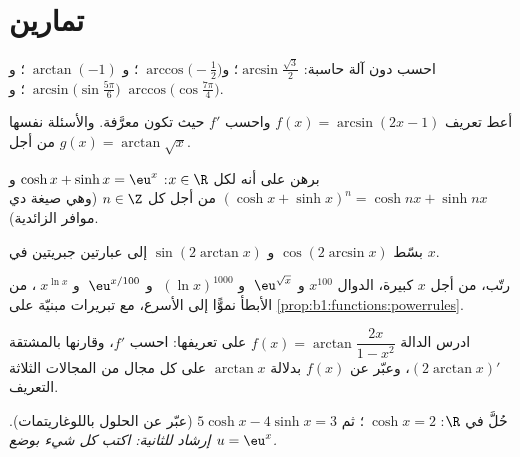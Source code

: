 \section{تمارين}

\begin{exercise}[$\star$]\label{exo:b1:functions:1}
احسب دون آلة حاسبة: $\arcsin\frac{\sqrt 3}{2}$؛
و$\;\arccos\bigl(-\frac 12\bigr)$؛ و $\;\arctan(-1)$؛
و$\;\arcsin\bigl(\sin\frac{5\pi}{6}\bigr)$؛
و$\;\arccos\bigl(\cos\frac{7\pi}{4}\bigr)$.
\end{exercise}

\begin{exercise}[$\star$]\label{exo:b1:functions:2}
أعط  تعريف $f(x) = \arcsin(2x - 1)$ واحسب
$f'$ حيث تكون معرَّفة. والأسئلة نفسها من أجل $g(x) = \arctan\sqrt{x}$.
\end{exercise}

\begin{exercise}[$\star$]\label{exo:b1:functions:3}
برهن على أنه لكل $x \in \R$: $\cosh x + \sinh x = \eu^x$ و
$(\cosh x + \sinh x)^n = \cosh nx + \sinh nx$ من أجل كل $n \in \Z$
(وهي صيغة دي موافر الزائدية).
\end{exercise}

\begin{exercise}[$\star$]\label{exo:b1:functions:4}
بسّط $\cos(2\arcsin x)$ و $\sin(2\arctan x)$ إلى عبارتين
جبريتين في $x$.
\end{exercise}

\begin{exercise}[$\star$]\label{exo:b1:functions:5}
رتّب، من أجل $x$ كبيرة، الدوال
$x^{100}$ و $\;\eu^{\sqrt x}$ و $\;(\ln x)^{1000}$ و $\;\eu^{x/100}$
و $\;x^{\ln x}$، من الأبطأ نموًّا إلى الأسرع، مع تبريرات
مبنيّة على \cref{prop:b1:functions:powerrules}.
\end{exercise}

\begin{exercise}[$\star\star$]\label{exo:b1:functions:6}
ادرس الدالة $f(x) = \arctan\dfrac{2x}{1 - x^2}$ على  تعريفها:
احسب $f'$، وقارنها بالمشتقة $(2\arctan x)'$، وعبّر عن $f(x)$
بدلالة $\arctan x$ على كل مجال من المجالات الثلاثة  التعريف.
\end{exercise}

\begin{exercise}[$\star\star$]\label{exo:b1:functions:7}
حُلَّ في $\R$: $\;\cosh x = 2$؛ ثم $5\cosh x - 4 \sinh x = 3$
(عبّر عن الحلول باللوغاريتمات). \emph{إرشاد للثانية:
اكتب كل شيء بوضع $u = \eu^x$.}
\end{exercise}

